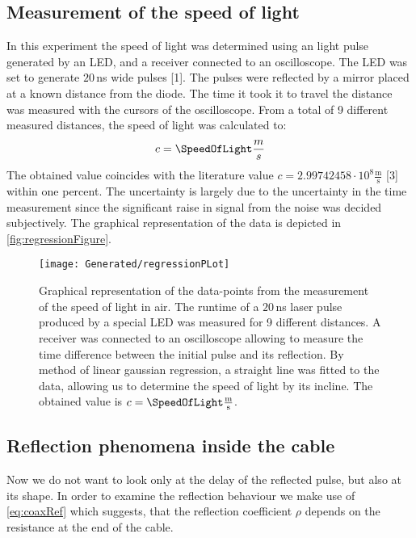 \documentclass[a4paper,10pt,twocolumn]{article}
\begin{document}
    \subsection{Measurement of the speed of light}
    \label{subsec:speedOfLightMeasurement}
    In this experiment the speed of light was determined using an light pulse generated by an LED, and a receiver connected to an oscilloscope.
    The LED was set to generate $20\,$ns wide pulses [1].
    The pulses were reflected by a mirror placed at a known distance from the diode.
    The time it took it to travel the distance was measured with the cursors of the oscilloscope.
    From a total of 9 different measured distances, the speed of light was calculated to:
    \begin{align}
        c = \SpeedOfLight \frac{m}{s}
    \end{align}
    The obtained value coincides with the literature value $c  = 2.99742458\cdot10^8 \frac{\text{m}}{\text{s}}$ [3] within one percent.
    The uncertainty is largely due to the uncertainty in the time measurement since the significant raise in signal from the noise was decided subjectively.
    The graphical representation of the data is depicted in \autoref{fig:regressionFigure}.
    \begin{figure}
        \begin{center}
            \texttt{[image: Generated/regressionPLot]}
            \caption[]{Graphical representation of the data-points from the measurement of the speed of light in air.
            The runtime of a $20\,$ns laser pulse produced by a special LED was measured for 9 different distances.
            A receiver was connected to an oscilloscope allowing to measure the time difference between the initial pulse and its reflection.
            By method of linear gaussian regression, a straight line was fitted to the data, allowing us to determine the speed of light by its incline.
            The obtained value is $c =\SpeedOfLight \frac{\text{m}}{\text{s}}$.
            }
            \label{fig:regressionFigure}
        \end{center}
    \end{figure}
    \label{sec:reflectionProperties}
    \subsection{Reflection phenomena inside the cable}
    Now we do not want to look only at the delay of the reflected pulse, but also at its shape.
    In order to examine the reflection behaviour we make use of \autoref{eq:coaxRef} which suggests, that the reflection
    coefficient $\rho$ depends on the resistance at the end of the cable.
    
\end{document}
